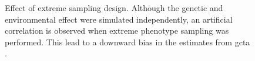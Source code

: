 \documentclass[12pt]{scrbook}
\begin{document}
\begin{figure}[t]
	\centering
	\caption[Effect of Extreme Sampling Design]
	{Effect of extreme sampling design.
		Although the genetic and environmental effect were simulated independently, an artificial correlation is observed when extreme phenotype sampling was performed. 
		This lead to a downward bias in the estimates from \gls{gcta} \citep{Golan2014}.
	} 
	\label{fig:extremeSampling}
\end{figure}
\end{document}
